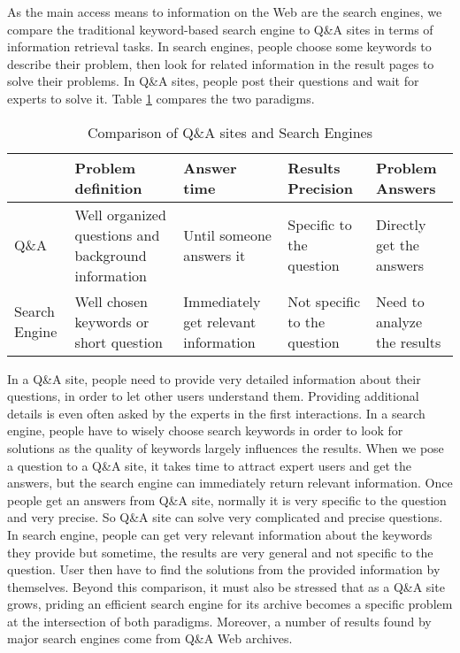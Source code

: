As the main access means to information on the Web are the search engines, we compare the traditional keyword-based search engine to Q\&A sites in terms of information retrieval tasks. In search engines, people choose some keywords to describe their problem, then look for related information in the result pages to solve their problems. In Q\&A sites, people post their questions and wait for experts to solve it. Table \ref{tab:intro_compare} compares the two paradigms. 
\begin{table}[!hbp]
\tiny
\centering
\begin{tabular}{|p{50pt}|p{60pt}|p{60pt}|p{60pt}|p{60pt}|}
\hline
& Problem definition & Answer time & Results Precision & Problem Answers \\
\hline
Q\&A & Well organized questions and background information & Until someone answers it & Specific to the question& Directly get the answers\\
\hline
Search Engine& Well chosen keywords or short question & Immediately get relevant information & Not specific to the question& Need to analyze the results\\
\hline
\end{tabular}
\caption{Comparison of Q\&A sites and Search Engines}
\label{tab:intro_compare}
\end{table}

In a Q\&A site, people need to provide very detailed information about their questions, in order to let other users understand them. Providing additional details is even often asked by the experts in the first interactions. In a search engine, people have to wisely choose search keywords in order to look for solutions as the quality of keywords largely influences the results. When we pose a question to a Q\&A site, it takes time to attract expert users and get the answers, but the search engine can immediately return relevant information. Once people get an answers from Q\&A site, normally it is very specific to the question and very precise. So Q\&A site can solve very complicated and precise questions. In search engine, people can get very relevant information about the keywords they provide but sometime, the results are very general and not specific to the question. User then have to find the solutions from the provided information by themselves. Beyond this comparison, it must also be stressed that as a Q\&A site grows, priding an efficient search engine for its archive becomes a specific problem at the intersection of both paradigms. Moreover, a number of results found by major search engines come from Q\&A Web archives.

